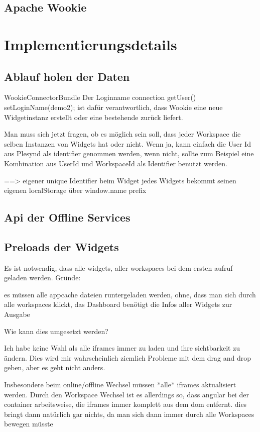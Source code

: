 \subsection{Apache Wookie}\label{section:apache_wookie}

\section{Implementierungsdetails}\label{section:implementierungsdetails}

\subsection{Ablauf holen der Daten}
WookieConnectorBundle
Der Loginname  connection getUser() setLoginName(demo2); ist dafür verantwortlich, dass Wookie eine neue Widgetinstanz erstellt oder eine bestehende zurück liefert.

Man muss sich jetzt fragen, ob es möglich sein soll, dass jeder Workspace die selben Instanzen von Widgets hat oder nicht.
Wenn ja, kann einfach die User Id aus Plesynd als identifier genommen werden, wenn nicht, sollte zum Beispiel eine Kombination aus UserId und WorkspaceId als Identifier benutzt werden.

==> eigener unique Identifier beim Widget
jedes Widgets bekommt seinen eigenen localStorage über window.name prefix

\subsection{Api der Offline Services}


\subsection{Preloads der Widgets}
Es ist notwendig, dass alle widgets, aller workspaces bei dem ersten aufruf geladen werden.
Gründe:

    es müssen alle appcache dateien runtergeladen werden, ohne, dass man sich durch alle workspaces klickt,
    das Dashboard benötigt die Infos aller Widgets zur Ausgabe

Wie kann dies umgesetzt werden?


Ich habe keine Wahl als alle iframes immer zu laden und ihre sichtbarkeit zu ändern. Dies wird mir wahrscheinlich ziemlich Probleme mit dem drag and drop geben, aber es geht nicht anders.

Insbesondere beim online/offline Wechsel müssen *alle* iframes aktualisiert werden. Durch den Workspace Wechsel ist es allerdings so, dass angular bei der container arbeitsweise, die iframes immer komplett aus dem dom entfernt. dies bringt dann natürlich gar nichts, da man sich dann immer durch alle Workspaces bewegen müsste


